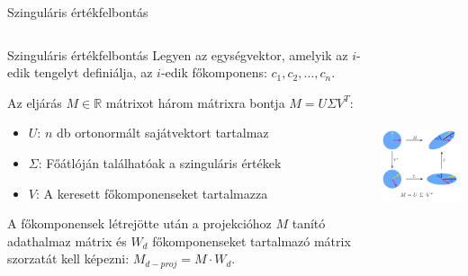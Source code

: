 \documentclass[english, aspectratio=169]{beamer}
\begin{document}
\begin{frame}{Szinguláris értékfelbontás}
\begin{columns}
\begin{column}{.6\textwidth}
\begin{block}{Szinguláris értékfelbontás}
Legyen az egységvektor, amelyik az $i$-edik tengelyt definiálja, az $i$-edik főkomponens: $c_1, c_2, \ldots, c_n$.\par\smallskip
Az eljárás $M\in \mathbb{R}$ mátrixot három mátrixra bontja $M = U \Sigma V^T$:
\begin{itemize}
	\item $U$: $n$ db ortonormált sajátvektort tartalmaz
	\item $\Sigma$: Főátlóján találhatóak a szinguláris értékek
	\item $V$: A keresett főkomponenseket tartalmazza
\end{itemize}
A főkomponensek létrejötte után a projekcióhoz $M$ tanító adathalmaz mátrix és $W_d$ főkomponenseket tartalmazó mátrix szorzatát kell képezni: $M_{d-proj} = M \cdot W_d$.
\end{block}
\end{column}
\begin{column}{.4\textwidth}
\begin{center}
\includegraphics[width=6cm, height=7cm, keepaspectratio]{images/unsupervised_13.png}
\end{center}
\end{column}
\end{columns}
\end{frame}
\end{document}
